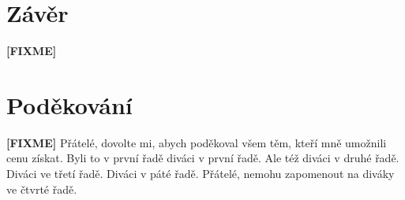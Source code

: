 \documentclass[fleqn,11pt]{ExcelAtFIT} %
\newcommand{\fixme}[1]{{\color{fixme} {{\textbf{[FIXME]}} #1} }}
\begin{document}
\section{Závěr}
\label{sec:Conclusions}

\fixme{\blindtext}


\section*{Poděkování}
\label{sec:Acknowledgements}


\fixme{Přátelé, dovolte mi, abych poděkoval všem těm, kteří mně umožnili cenu získat. Byli to v první řadě diváci v první řadě. Ale též diváci v druhé řadě. Diváci ve třetí řadě. Diváci v páté řadě. Přátelé, nemohu zapomenout na diváky ve čtvrté řadě.}





\end{document}
